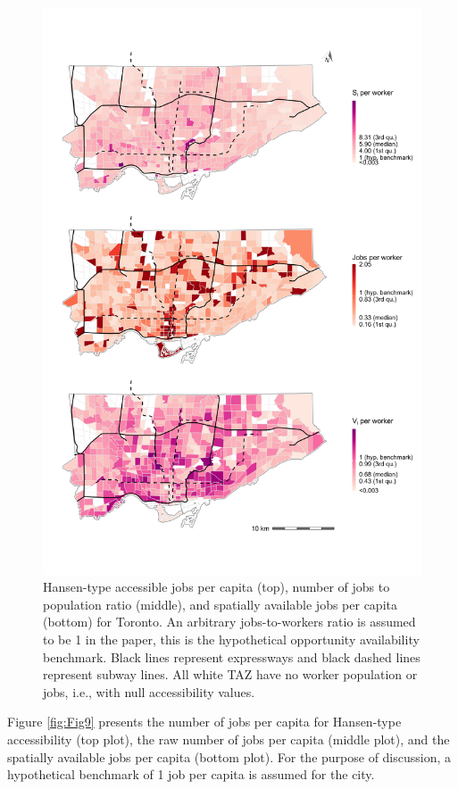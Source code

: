 \documentclass[10pt,letterpaper]{article}
\begin{document}
\begin{figure}
\includegraphics[width=1\linewidth]{images/Fig9} \caption{\label{fig:Fig9}Hansen-type accessible jobs per capita (top), number of jobs to population ratio (middle), and spatially available jobs per capita (bottom) for Toronto. An arbitrary jobs-to-workers ratio is assumed to be 1 in the paper, this is the hypothetical opportunity availability benchmark. Black lines represent expressways and black dashed lines represent subway lines. All white TAZ have no worker population or jobs, i.e., with null accessibility values.}\label{fig:rate-accessibility-plot}
\end{figure}

Figure \ref{fig:Fig9} presents the number of jobs per capita for
Hansen-type accessibility (top plot), the raw number of jobs per capita
(middle plot), and the spatially available jobs per capita (bottom
plot). For the purpose of discussion, a hypothetical benchmark of 1 job
per capita is assumed for the city.
\end{document}
